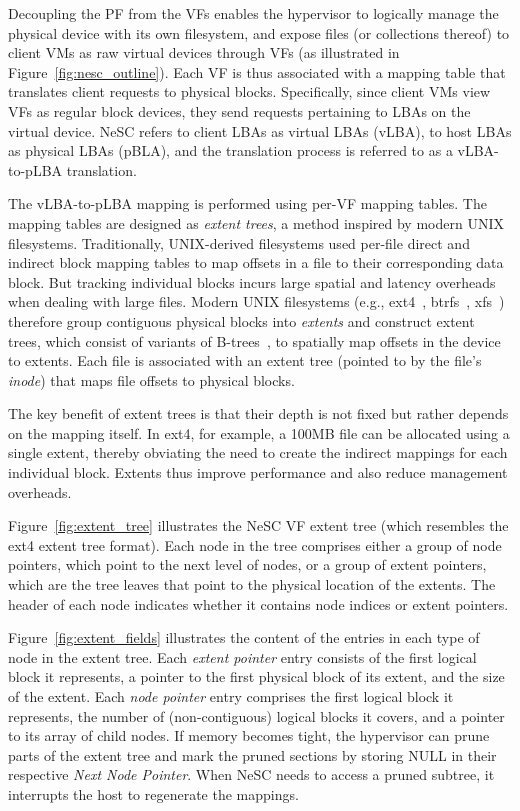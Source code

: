 Decoupling the PF from the VFs enables the hypervisor to logically manage the physical device with its own filesystem, and expose files (or collections thereof) to client VMs as raw virtual devices through VFs (as illustrated in Figure~\ref{fig:nesc_outline}). Each VF is thus associated with a mapping table that translates client requests to physical blocks. Specifically, since client VMs view VFs as regular block devices, they send requests pertaining to LBAs on the virtual device. NeSC refers to client LBAs as virtual LBAs (vLBA), to host LBAs as physical LBAs (pBLA), and the translation process is referred to as a vLBA-to-pLBA translation.

The vLBA-to-pLBA mapping is performed using per-VF mapping tables. The mapping tables are designed as \emph{extent trees}, a method inspired by modern UNIX filesystems.
%
Traditionally, UNIX-derived filesystems used per-file direct and indirect  block mapping tables to map offsets in a file to their corresponding data block. But tracking individual blocks incurs large spatial and latency overheads when dealing with large files. Modern UNIX filesystems (e.g., ext4~\cite{mathur07ext4}, btrfs~\cite{rodeh13btrfs}, xfs~\cite{sweeney96xfs}) therefore group contiguous physical blocks into \emph{extents} and construct extent trees, which consist of variants of B-trees~\cite{comer79btree}, to spatially map offsets in the device to extents.
Each file is associated with an extent tree (pointed to by the file's \emph{inode}) that maps file offsets to physical blocks.

The key benefit of extent trees is that their depth is not fixed but rather depends on the mapping itself. In ext4, for example, a 100MB file can be allocated using a single extent, thereby obviating the need to create the indirect mappings for each individual block. Extents thus improve performance and also reduce management overheads.

Figure~\ref{fig:extent_tree} illustrates the NeSC VF extent tree (which resembles the ext4 extent tree format). Each node in the tree comprises either a group of node pointers, which point to the next level of nodes, or a group of extent pointers, which are the tree leaves that point to the physical location of the extents. The header of each node indicates whether it contains node indices or extent pointers. 
 
Figure~\ref{fig:extent_fields} illustrates the content of the entries in each type of node in the extent tree. Each \emph{extent pointer} entry consists of the first logical block it represents, a pointer to the first physical block of its extent, and the size of the extent. Each \emph{node pointer} entry comprises the first logical block it represents, the number of (non-contiguous) logical blocks it covers, and a pointer to its array of child nodes.
%
If memory becomes tight, the hypervisor can prune parts of the extent tree and mark the pruned sections by storing NULL in their respective \emph{Next Node Pointer}. When NeSC needs to access a pruned subtree, it interrupts the host to regenerate the mappings.

